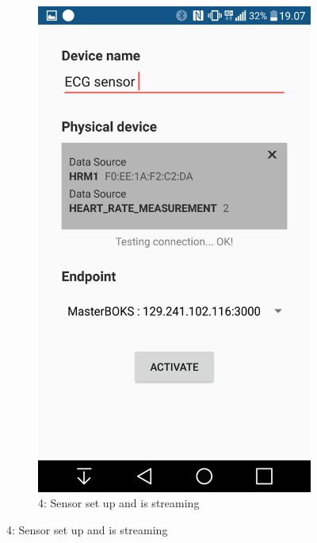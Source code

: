 \begin{figure}[H]
\begin{subfigure}[b]{0.49\textwidth}
        \includegraphics[width=\textwidth]{img/gw4.png}
        \caption*{4: Sensor set up and is streaming}
        \label{fig:14dbpassword}
    \end{subfigure}
\end{figure}